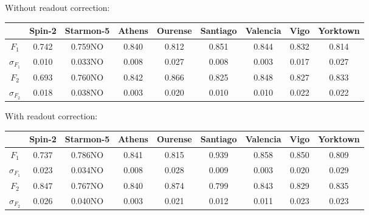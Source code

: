 Without readout correction:
\begin{table}[H]
    \centering
    \begin{tabular}{|c|c|c|c|c|c|c|c|c|}
    \hline
    \textbf{} & \textbf{Spin-2} & \textbf{Starmon-5} & \textbf{Athens} & \textbf{Ourense} & \textbf{Santiago} & \textbf{Valencia} & \textbf{Vigo} & \textbf{Yorktown} \\ \hline
    $F_1$              & 0.742  & 0.759NO & 0.840 & 0.812 & 0.851 & 0.844 & 0.832 & 0.814 \\ \hline
    $\sigma_{F_1}$     & 0.010  & 0.033NO & 0.008 & 0.027 & 0.008 & 0.003 & 0.017 & 0.027 \\ \hline
    $F_2$              & 0.693  & 0.760NO & 0.842 & 0.866 & 0.825 & 0.848 & 0.827 & 0.833 \\ \hline
    $\sigma_{F_2}$     & 0.018  & 0.038NO & 0.003 & 0.020 & 0.010 & 0.010 & 0.022 & 0.022 \\ \hline
    \end{tabular}
\end{table}

With readout correction:
\begin{table}[H]
    \centering
    \begin{tabular}{|c|c|c|c|c|c|c|c|c|}
    \hline
    \textbf{} & \textbf{Spin-2} & \textbf{Starmon-5} & \textbf{Athens} & \textbf{Ourense} & \textbf{Santiago} & \textbf{Valencia} & \textbf{Vigo} & \textbf{Yorktown} \\ \hline
    $F_1$              & 0.737 & 0.786NO & 0.841 & 0.815 & 0.939 & 0.858 & 0.850 & 0.809 \\ \hline
    $\sigma_{F_1}$     & 0.023 & 0.034NO & 0.008 & 0.028 & 0.009 & 0.003 & 0.020 & 0.029 \\ \hline
    $F_2$              & 0.847 & 0.767NO & 0.840 & 0.874 & 0.799 & 0.843 & 0.829 & 0.835 \\ \hline
    $\sigma_{F_2}$     & 0.026 & 0.040NO & 0.003 & 0.021 & 0.012 & 0.011 & 0.023 & 0.023 \\ \hline
    \end{tabular}
\end{table}
